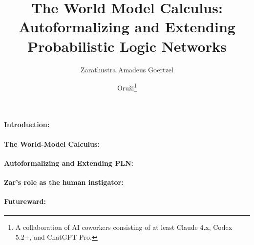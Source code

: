 \documentclass{easychair}
\title{The World Model Calculus: \\ Autoformalizing and Extending Probabilistic Logic Networks
}
\author{
Zarathustra Amadeus Goertzel%
\and Oruži\thanks{A collaboration of AI coworkers consisting of at least Claude 4.x, Codex 5.2+, and ChatGPT Pro.}
}
\institute{
  Czech Technical University in Prague, Czech Republic
 }
\newcommand{\revise}{\mathbin{\oplus}}
\newcommand{\tensor}{\mathbin{\otimes}}
\begin{document}
\maketitle

\vspace{-3mm}
\paragraph*{Introduction:}

\vspace{-3mm}
\paragraph*{The World-Model Calculus:}

\vspace{-3mm}
\paragraph*{Autoformalizing and Extending PLN:}

\vspace{-3mm}
\paragraph*{Zar's role as the human instigator:}

\vspace{-3mm}
\paragraph*{Futureward:}
\end{document}
